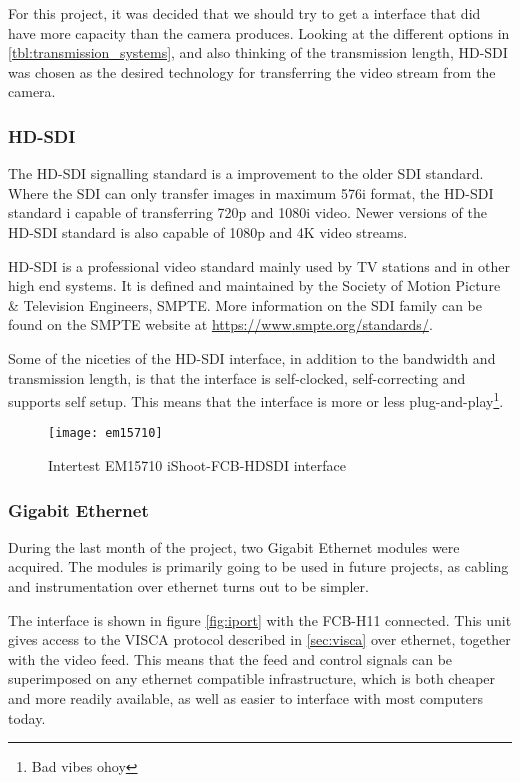 For this project, it was decided that we should 
try to get a interface that did have more capacity than the camera produces. Looking 
at the different options in \vref{tbl:transmission_systems}, and also thinking of the transmission length, HD-SDI
was chosen as the desired technology for transferring the video stream from the camera.

\subsubsection{HD-SDI}\label{sec:hdsdi}
The HD-SDI signalling standard is a improvement to the older SDI standard. Where the SDI can only transfer images
in maximum 576i format, the HD-SDI standard i capable of transferring 720p and 1080i video. Newer versions 
of the HD-SDI standard is also capable of 1080p and 4K video streams. 

HD-SDI is a professional video standard mainly used by TV stations and in other high end systems. It is 
defined and maintained by the Society of Motion Picture \& Television Engineers, SMPTE. More information 
on the SDI family can be found on the SMPTE website at \url{https://www.smpte.org/standards/}.

Some of the niceties of the HD-SDI interface, in addition to the bandwidth and transmission length, is 
that the interface is self-clocked, self-correcting and supports self setup. This means that the 
interface is more or less plug-and-play\footnote{Bad vibes ohoy}. 

\begin{figure}[htbp]
	\centering
	\texttt{[image: em15710]}
	\caption{Intertest EM15710 iShoot-FCB-HDSDI interface}
	\label{fig:em15710}
\end{figure}

\subsubsection{Gigabit Ethernet}
During the last month of the project, two Gigabit Ethernet modules were acquired. The modules is primarily 
going to be used in future projects, as cabling and instrumentation over ethernet turns out to be simpler. 

The interface is shown in figure \vref{fig:iport} with the FCB-H11 connected. This unit gives access to the VISCA protocol described 
in \vref{sec:visca} over ethernet, together with the video feed. This means that the feed and control signals can be superimposed 
on any ethernet compatible infrastructure, which is both cheaper and more readily available, as well as easier 
to interface with most computers today.

